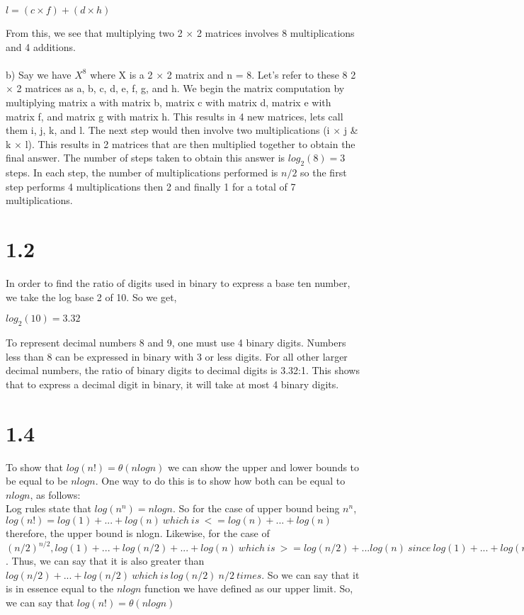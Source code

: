 \documentclass[12pt]{article}
\begin{document}
$l = (c \times f) + (d \times h)$

From this, we see that multiplying two 2 $\times$ 2 matrices involves 8 multiplications and 4 additions.
\\
\\
b) Say we have $X^{8}$ where X is a 2 $\times$ 2 matrix and n = 8. Let's refer to these 8 2 $\times$ 2 matrices as a, b, c, d, e, f, g, and h. We begin the matrix computation by multiplying matrix a with matrix b, matrix c with matrix d, matrix e with matrix f, and matrix g with matrix h. This results in 4 new matrices, lets call them i, j, k, and l. The next step would then involve two multiplications (i $\times$ j \& k $\times$ l). This results in 2 matrices that are then multiplied together to obtain the final answer. The number of steps taken to obtain this answer is $log_2(8) = 3$ steps. In each step, the number of multiplications performed is $n/2$ so the first step performs 4 multiplications then 2 and finally 1 for a total of 7 multiplications.

\section*{1.2}

In order to find the ratio of digits used in binary to express a base ten number, we take the log base 2 of 10. So we get,

$log_2(10) = 3.32$

To represent decimal numbers 8 and 9, one must use 4 binary digits. Numbers less than 8 can be expressed in binary with 3 or less digits. For all other larger decimal numbers, the ratio of binary digits to decimal digits is 3.32:1. This shows that to express a decimal digit in binary, it will take at most 4 binary digits.

\section*{1.4}
To show that $log(n!) = \theta(nlogn)$ we can show the upper and lower bounds to be equal to be $nlogn$. One way to do this is to show how both can be equal to $nlogn$, as follows: \\ Log rules state that $log(n^{n}) = nlogn$. So for the case of upper bound being $n^{n}$, $log(n!) = log(1) + ... + log(n) \ which \ is \ <= log(n) + ... + log(n)$ therefore, the upper bound is nlogn. Likewise, for the case of $(n/2)^{n/2}, log(1) + ... + log(n/2) + ... + log(n) \ which \ is \ >= log(n/2) + ... log(n) \ since \ log(1) + ... + log(n/2) >= 0$. Thus, we can say that it is also greater than $log(n/2) + ... + log(n/2) \ which \ is \ log(n/2) \ n/2 \ times$. So we can say that it is in essence equal to the $nlogn$ function we have defined as our upper limit. So, we can say that $log(n!) = \theta(nlogn)$
\end{document}
